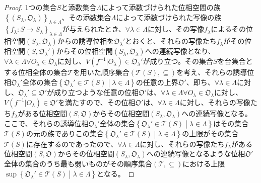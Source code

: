 \documentclass[dvipdfmx]{jsarticle}
\begin{document}
\begin{proof}
1つの集合$S$と添数集合$\varLambda$によって添数づけられた位相空間の族$\left\{ \left( S_{\lambda},\mathfrak{O}_{\lambda} \right) \right\}_{\lambda \in \varLambda}$、その添数集合$\varLambda$によって添数づけられた写像の族$\left\{ f_{\lambda}:S \rightarrow S_{\lambda} \right\}_{\lambda \in \varLambda}$が与えられたとき、$\forall\lambda \in \varLambda$に対し、その写像$f_{\lambda}$によるその位相空間$\left( S_{\lambda},\mathfrak{O}_{\lambda} \right)$からの誘導位相を$\mathfrak{O}_{\lambda}'$とおくと、それらの写像たち$f_{\lambda}$がその位相空間$\left( S,\mathfrak{O}_{\lambda}' \right)$からその位相空間$\left( S_{\lambda},\mathfrak{O}_{\lambda} \right)$への連続写像となり、$\forall\lambda \in \varLambda\forall O_{\lambda} \in \mathfrak{O}_{\lambda}$に対し、$V\left( f^{- 1}|O_{\lambda} \right) \in \mathfrak{O}_{\lambda}'$が成り立つ。その集合$S$を台集合とする位相全体の集合$\mathcal{T}$を用いた順序集合$\left( \mathcal{T}(S), \subseteq \right)$を考え、それらの誘導位相$\mathfrak{O}_{\lambda}'$全体の集合$\left\{ \mathfrak{O}_{\lambda}'\in \mathcal{T}(S) \middle| \lambda \in \varLambda \right\}$の任意の上界$\mathfrak{O}'$、即ち、$\forall\lambda \in \varLambda$に対し、$\mathfrak{O}_{\lambda}' \subseteq \mathfrak{O}'$が成り立つような任意の位相$\mathfrak{O}'$は、$\forall\lambda \in \varLambda\forall O_{\lambda} \in \mathfrak{O}_{\lambda}$に対し、$V\left( f^{- 1}|O_{\lambda} \right) \in \mathfrak{O}'$を満たすので、その位相$\mathfrak{O}'$は、$\forall\lambda \in \varLambda$に対し、それらの写像たち$f_{\lambda}$がある位相空間$\left( S,\mathfrak{O} \right)$からその位相空間$\left( S_{\lambda},\mathfrak{O}_{\lambda} \right)$への連続写像となる。ここで、それらの誘導位相$\mathfrak{O}_{\lambda}'$全体の集合$\left\{ \mathfrak{O}_{\lambda}'\in \mathcal{T}(S) \middle| \lambda \in \varLambda \right\}$はその集合$\mathcal{T}(S)$の元の族でありこの集合$\left\{ \mathfrak{O}_{\lambda}'\in \mathcal{T}(S) \middle| \lambda \in \varLambda \right\}$の上限がその集合$\mathcal{T}(S)$に存在するのであったので、$\forall\lambda \in \varLambda$に対し、それらの写像たち$f_{\lambda}$がある位相空間$\left( S,\mathfrak{O} \right)$からその位相空間$\left( S_{\lambda},\mathfrak{O}_{\lambda} \right)$への連続写像となるような位相$\mathfrak{O}'$全体の集合のうち最も弱いものがその順序集合$\left( \mathcal{T, \subseteq} \right)$における上限$\sup\left\{ \mathfrak{O}_{\lambda}'\in \mathcal{T}(S) \middle| \lambda \in \varLambda \right\}$となる。
\end{proof}
\end{document}
